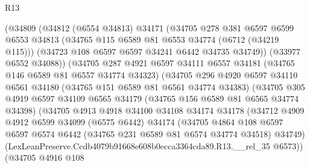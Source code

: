 \begin{lexlean}{R13}
\begin{coremodule}
                    (@34809
                      (@34812
                        (@6554 @34813)
                        @34171
                        (@34705
                          @278
                          @381
                          @6597
                          @6599
                          @6553
                          @34813
                          (@34765 @115 @6589 @81 @6553 @34774 (@6712 (@34219 @115)))
                          (@34723 @108 @6597 @6597 @34241 @6442 @34735 @34749))
                        (@33977 @6552 @34088))
                      (@34705
                        @287
                        @4921
                        @6597
                        @34111
                        @6557
                        @34181
                        (@34765 @146 @6589 @81 @6557 @34774 @34323)
                        (@34705
                          @296
                          @4920
                          @6597
                          @34110
                          @6561
                          @34180
                          (@34765 @151 @6589 @81 @6561 @34774 @34383)
                          (@34705
                            @305
                            @4919
                            @6597
                            @34109
                            @6565
                            @34179
                            (@34765 @156 @6589 @81 @6565 @34774 @34398)
                            (@34705
                              @4913
                              @4918
                              @34100
                              @34108
                              @34174
                              @34178
                              (@34712
                                @4909
                                @4912
                                @6599
                                @34099
                                (@6575 @6442)
                                @34174
                                (@34705
                                  @4864
                                  @108
                                  @6597
                                  @6597
                                  @6574
                                  @6442
                                  (@34765 @231 @6589 @81 @6574 @34774 @34518)
                                  @34749)
                                (LexLeanPreserve.Ccdb4079b91668e608b0ecca3364cda89.R13.__rel_35
                                  @6573))
                              (@34705
                                @4916
                                @108

\end{coremodule}
\end{lexlean}
